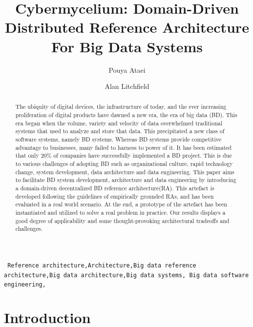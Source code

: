 \documentclass[review]{elsarticle}
\begin{document}
\begin{frontmatter}

\title{Cybermycelium: Domain-Driven Distributed Reference Architecture For Big Data Systems}

\author{Pouya Ataei}
\author{Alan Litchfield}

\address[mymainaddress]{School of Engineering, Computer and Mathematical Sciences, Auckland University of Technology, Auckland, New Zealand}


\begin{abstract}
The ubiquity of digital devices, the infrastructure of today, and the ever increasing proliferation of digital products have dawned a new era, the era of big data (BD). This era began when the volume, variety and velocity of data overwhelmed traditional systems that used to analyze and store that data. This precipitated a new class of software systems, namely BD systems. Whereas BD systems provide competitive advantage to businesses, many failed to harness to power of it. It has been estimated that only 20\% of companies have successfully implemented a BD project. This is due to various challenges of adopting BD such as organizational culture, rapid technology change, system development, data architecture and data engineering. This paper aims to facilitate BD system development, architecture and data engineering by introducing a domain-driven decentralized BD reference architecture(RA). This artefact is developed following the guidelines of empirically grounded RAs, and has been evaluated in a real world scenario. At the end, a prototype of the artefact has been instantiated and utilized to solve a real problem in practice. Our results displays a good degree of applicability and some thought-provoking architectural tradeoffs and challenges.
\end{abstract}

\begin{keyword}
\texttt{ Reference architecture\sep Architecture\sep Big data
reference architecture\sep Big data architecture\sep Big data systems\sep
Big data software engineering\sep}
\end{keyword}

\end{frontmatter}

\linenumbers

\section{Introduction}
\end{document}
